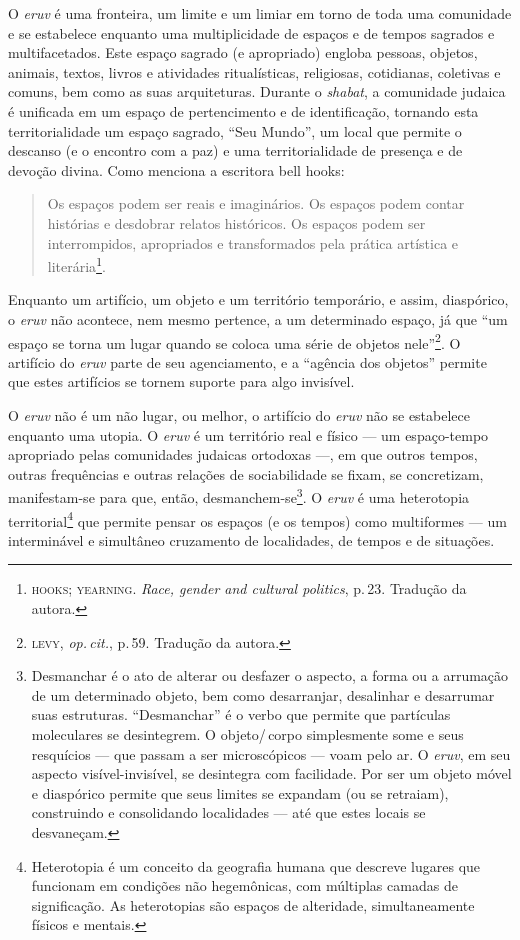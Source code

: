 \begin{center}\end{center}

\noindent{}O \emph{eruv} é uma fronteira, um limite e um limiar em torno de toda
uma comunidade e se estabelece enquanto uma multiplicidade de espaços e
de tempos sagrados e multifacetados. Este espaço sagrado (e apropriado)
engloba pessoas, objetos, animais, textos, livros e atividades
ritualísticas, religiosas, cotidianas, coletivas e comuns, bem como as
suas arquiteturas. Durante o \emph{shabat}, a comunidade judaica é
unificada em um espaço de pertencimento e de identificação, tornando
esta territorialidade um espaço sagrado, ``Seu Mundo'', um local
que permite o descanso (e o encontro com a paz) e uma territorialidade
de presença e de devoção divina. Como menciona a escritora bell hooks:

\begin{quote}
Os espaços podem ser reais e imaginários. Os espaços podem contar
histórias e desdobrar relatos históricos. Os espaços podem ser
interrompidos, apropriados e transformados pela prática artística e
literária\footnote{\textsc{hooks}; \textsc{yearning}. \emph{Race, gender and cultural
  politics}, p.\,23. Tradução da autora.}.
\end{quote}

Enquanto um artifício, um objeto e um território temporário, e assim,
diaspórico, o \emph{eruv} não acontece, nem mesmo pertence, a um
determinado espaço, já que ``um espaço se torna um lugar quando se
coloca uma série de objetos nele''\footnote{\textsc{levy}, \emph{op.\,cit.}, p.\,59. Tradução da autora.}. O artifício do \emph{eruv} parte de seu
agenciamento, e a ``agência dos objetos'' permite que estes artifícios
se tornem suporte para algo invisível.

O \emph{eruv} não é um não lugar, ou melhor, o artifício do \emph{eruv}
não se estabelece enquanto uma utopia. O \emph{eruv} é um território
real e físico --- um espaço-tempo apropriado pelas comunidades judaicas
ortodoxas ---, em que outros tempos, outras frequências e outras
relações de sociabilidade se fixam, se concretizam, manifestam-se para
que, então, desmanchem-se\footnote{Desmanchar é o ato de alterar ou
  desfazer o aspecto, a forma ou a arrumação de um determinado objeto,
  bem como desarranjar, desalinhar e desarrumar suas estruturas.
  ``Desmanchar'' é o verbo que permite que partículas moleculares se
  desintegrem. O objeto/\,corpo simplesmente some e seus resquícios ---
  que passam a ser microscópicos --- voam pelo ar. O \emph{eruv}, em seu
  aspecto visível-invisível, se desintegra com facilidade. Por ser um
  objeto móvel e diaspórico permite que seus limites se expandam (ou se
  retraiam), construindo e consolidando localidades --- até que estes
  locais se desvaneçam.}. O \emph{eruv} é uma heterotopia
territorial\footnote{Heterotopia é um conceito da geografia humana que
  descreve lugares que funcionam em condições não hegemônicas, com
  múltiplas camadas de significação. As heterotopias são espaços de
  alteridade, simultaneamente físicos e mentais.} que permite pensar os
espaços (e os tempos) como multiformes --- um interminável e simultâneo
cruzamento de localidades, de tempos e de situações.

